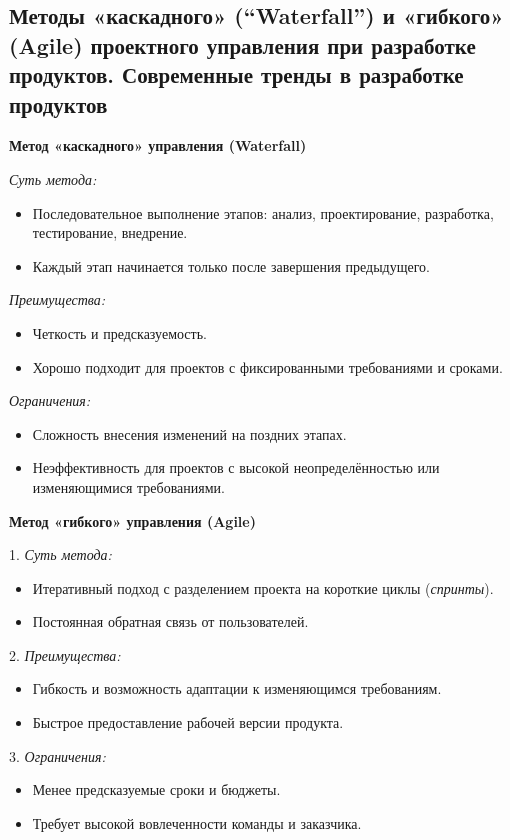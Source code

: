 \subsection{Методы «каскадного» (“Waterfall”) и «гибкого» (Agile) проектного управления при разработке продуктов. Современные тренды в разработке продуктов}

\textbf{Метод «каскадного» управления (Waterfall)}

\textit{Суть метода:}
\begin{itemize}
    \item Последовательное выполнение этапов: анализ, проектирование, разработка, тестирование, внедрение.
    \item Каждый этап начинается только после завершения предыдущего.
\end{itemize}

\textit{Преимущества:}
\begin{itemize}
    \item Четкость и предсказуемость.
    \item Хорошо подходит для проектов с фиксированными требованиями и сроками.
\end{itemize}

\textit{Ограничения:}
\begin{itemize}
    \item Сложность внесения изменений на поздних этапах.
    \item Неэффективность для проектов с высокой неопределённостью или изменяющимися требованиями.
\end{itemize}

\textbf{Метод «гибкого» управления (Agile)}

1. \textit{Суть метода:}
\begin{itemize}
    \item Итеративный подход с разделением проекта на короткие циклы (\textit{спринты}).
    \item Постоянная обратная связь от пользователей.
\end{itemize}

2. \textit{Преимущества:}
\begin{itemize}
    \item Гибкость и возможность адаптации к изменяющимся требованиям.
    \item Быстрое предоставление рабочей версии продукта.
\end{itemize}

3. \textit{Ограничения:}
\begin{itemize}
    \item Менее предсказуемые сроки и бюджеты.
    \item Требует высокой вовлеченности команды и заказчика.
\end{itemize}

